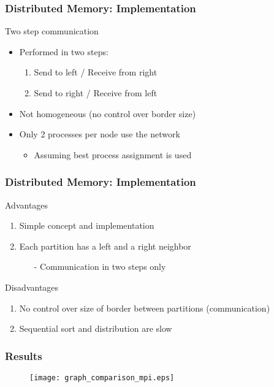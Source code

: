 \begin{frame}
	\frametitle{Distributed Memory: Implementation}

	\begin{block}{Two step communication}
		\begin{itemize}\itemsep=20pt
			\item Performed in two steps:
			\begin{enumerate}\itemsep=10pt
				\item Send to left / Receive from right
				\item Send to right / Receive from left
			\end{enumerate}

			\item Not homogeneous (no control over border size)

			\item Only 2 processes per node use the network
			\begin{itemize}
				\item Assuming best process assignment is used
			\end{itemize}
		\end{itemize}
	\end{block}
\end{frame}

\begin{frame}
\frametitle{Distributed Memory: Implementation}

	\begin{block}{Advantages}
		\begin{enumerate}\itemsep=10pt
			\item Simple concept and implementation
			\item Each partition has a left and a right neighbor
			\begin{itemize}
				\item[-] Communication in two steps only
			\end{itemize}
		\end{enumerate}
	\end{block}

	\begin{block}{Disadvantages}
		\begin{enumerate}\itemsep=10pt
			\item No control over size of border between partitions (communication)
			\item Sequential sort and distribution are slow
		\end{enumerate}
	\end{block}

\end{frame}

\begin{frame}
	\frametitle{Results}
	\begin{figure}
		\centering
		\texttt{[image: graph\_comparison\_mpi.eps]}
	\end{figure}
\end{frame}

